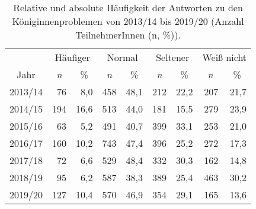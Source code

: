 \begin{table}[H]
    \centering
    \caption{Relative und absolute Häufigkeit der Antworten zu den Königinnenproblemen von 2013/14 bis 2019/20 (Anzahl TeilnehmerInnen (n, \%)).}
    \label{tab:u:queenproblems}
    \begin{tabular}{c|*{3}{rr|}*{2}{r}}
        \toprule
            \multicolumn{1}{c}{} & 
            \multicolumn{2}{c|}{Häufiger} & 
            \multicolumn{2}{c|}{Normal} & 
            \multicolumn{2}{c|}{Seltener} &
            \multicolumn{2}{c}{Weiß nicht}
            \\
        \cmidrule{2-9}
            \multicolumn{1}{c}{Jahr} & 
            \multicolumn{1}{c}{\textit{n}} & 
            \multicolumn{1}{c|}{\%} & 
            \multicolumn{1}{c}{\textit{n}} & 
            \multicolumn{1}{c|}{\%} & 
            \multicolumn{1}{c}{\textit{n}} & 
            \multicolumn{1}{c|}{\%} &
            \multicolumn{1}{c}{\textit{n}} & 
            \multicolumn{1}{c}{\%} \\
        \midrule
     2013/14 &  76 &  8,0 & 458 & 48,1 & 212 & 22,2 & 207 & 21,7 \\
     2014/15 & 194 & 16,6 & 513 & 44,0 & 181 & 15,5 & 279 & 23,9 \\
     2015/16 &  63 &  5,2 & 491 & 40,7 & 399 & 33,1 & 253 & 21,0 \\
     2016/17 & 160 & 10,2 & 743 & 47,4 & 396 & 25,2 & 272 & 17,3 \\
     2017/18 &  72 &  6,6 & 529 & 48,4 & 332 & 30,3 & 162 & 14,8 \\
     2018/19 &  95 &  6,2 & 587 & 38,3 & 389 & 25,4 & 463 & 30,2 \\
     2019/20 & 127 & 10,4 & 570 & 46,9 & 354 & 29,1 & 165 & 13,6 \\
     \bottomrule
    \end{tabular}
\end{table}